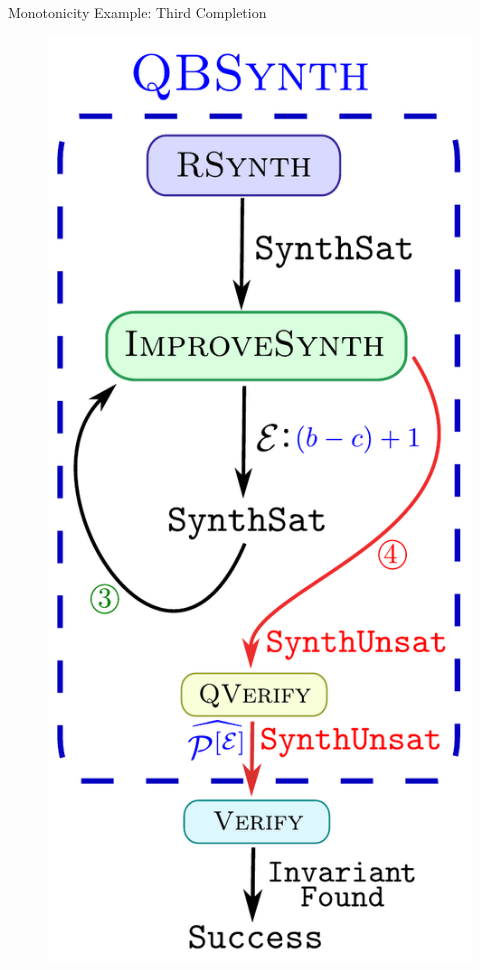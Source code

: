 \documentclass[9pt]{beamer}
\begin{document}
\begin{frame}[fragile]{Monotonicity Example: Third Completion}
\begin{figure}[t]
\begin{minipage}{0.45\columnwidth}
        \includegraphics[scale=0.3]{assets/stage3.pdf}
    \end{minipage}
\end{figure}
\end{frame}
\end{document}
